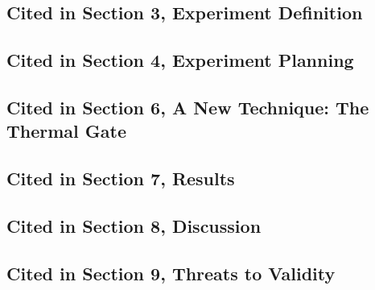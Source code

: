 \documentclass[10pt,a4paper]{article}
\begin{document}
\subsection*{Cited in Section 3, Experiment Definition}

\FloatBarrier
\subsection*{Cited in Section 4, Experiment Planning}

\FloatBarrier

\FloatBarrier

\FloatBarrier

\FloatBarrier

\FloatBarrier
\subsection*{Cited in Section 6, A New Technique: The Thermal Gate}

\FloatBarrier

\FloatBarrier

\FloatBarrier
\subsection*{Cited in Section 7, Results}

\FloatBarrier

\FloatBarrier

\FloatBarrier

\FloatBarrier

\FloatBarrier
\subsection*{Cited in Section 8, Discussion}

\FloatBarrier

\FloatBarrier

\FloatBarrier

\FloatBarrier
\subsection*{Cited in Section 9, Threats to Validity}

\FloatBarrier

\FloatBarrier
\end{document}
